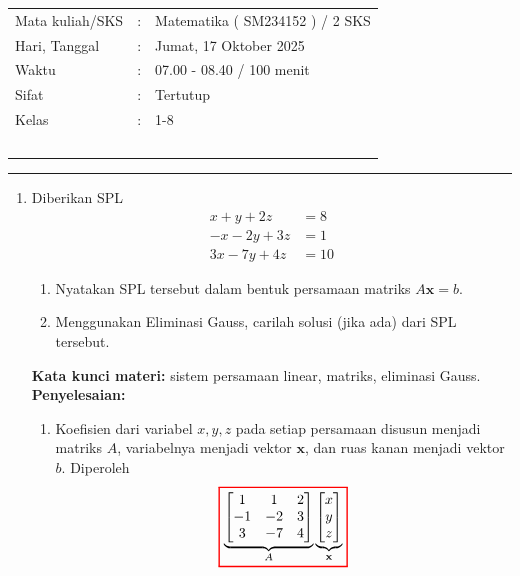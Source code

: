 \documentclass[10pt,openany,a4paper]{article}
\theoremstyle{definition}
\theoremstyle{definition}
\theoremstyle{plain}
\newenvironment{jawab}[2][tes]{%
\par\noindent\textbf{Kata kunci materi:} #1.\\
\textbf{Penyelesaian:} #2%
}{}
\begin{document}
    \begin{center}
	\begin{tabular}{lcl}
		Mata kuliah/SKS & : & Matematika ( SM234152 ) / 2 SKS\\
		Hari, Tanggal & : & Jumat, 17 Oktober 2025\\
		Waktu & : & 07.00 - 08.40 / 100 menit\\
		Sifat & : & Tertutup\\
		Kelas & : & 1-8\\
  ~
	\end{tabular}

    \noindent\rule{\textwidth}{2.pt}
        \end{center}
\begin{enumerate}
    \item Diberikan SPL
    \begin{align*}
        x+y+2z &= 8\\
        -x-2y+3z &= 1\\
        3x-7y+4z &= 10
    \end{align*}
    \begin{enumerate}
        \item Nyatakan SPL tersebut dalam bentuk persamaan matriks $A\mathbf{x}=b$.
        \item Menggunakan Eliminasi Gauss, carilah solusi (jika ada) dari SPL tersebut.
    \end{enumerate}
    \begin{jawab}[sistem persamaan linear, matriks, eliminasi Gauss]{
        \begin{enumerate}
            \item Koefisien dari variabel $x,y,z$ pada setiap persamaan disusun menjadi matriks $A$, variabelnya menjadi vektor $\mathbf{x}$, dan ruas kanan menjadi vektor $b$. Diperoleh
            \begin{align*}
                \colorlet{oldcolor}{.}
        \color{red}
        \setlength{\fboxrule}{1pt} \boxed{\color{oldcolor}\underbrace{\begin{bmatrix}
                    1 & 1 & 2\\
                    -1 & -2 & 3\\
                    3 & -7 & 4
                \end{bmatrix}}_{A}
                \underbrace{\begin{bmatrix}
                    x\\ y\\ z
                \end{bmatrix}}_{\mathbf{x}}
}
\end{align*}
\end{enumerate}}
\end{jawab}
\end{enumerate}
\end{document}
